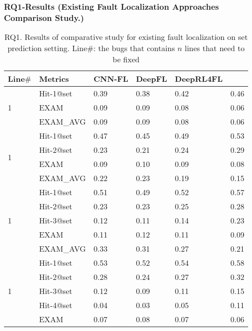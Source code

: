 \subsubsection{RQ1-Results ({\bf Existing Fault Localization Approaches Comparison Study.})}

\begin{table}[h]
	\caption{RQ1. Results of comparative study for existing fault localization on set prediction setting. Line$\#$: the bugs that contains $n$ lines that need to be fixed}
	{\small
		\begin{center}
			\renewcommand{\arraystretch}{1}
			\begin{tabular}{p{0.5cm}<{\centering}|p{1.5cm}<{\centering}|p{1cm}<{\centering}|p{0.8cm}<{\centering}|p{1.2cm}<{\centering}|p{1.2cm}<{\centering}}
				\hline
				Line$\#$ & Metrics & CNN-FL & DeepFL & DeepRL4FL & \tool \\
				\hline
				\multirow{3}{*}{1}   & Hit-1@set     & 0.39 & 0.38 & 0.42 & 0.46 \\
							    	 & EXAM          & 0.09 & 0.09 & 0.08 & 0.06 \\
									 & EXAM\_AVG     & 0.09 & 0.09 & 0.08 & 0.06 \\
				\hline
				\multirow{4}{*}{1}  & Hit-1@set     & 0.47 & 0.45 & 0.49 & 0.53 \\
									& Hit-2@set     & 0.23 & 0.21 & 0.24 & 0.29 \\
								   	& EXAM          & 0.09 & 0.10 & 0.09 & 0.08 \\
			                     	& EXAM\_AVG     & 0.22 & 0.23 & 0.19 & 0.15 \\
				\hline
				\multirow{5}{*}{1}  & Hit-1@set     & 0.51 & 0.49 & 0.52 & 0.57 \\
									& Hit-2@set     & 0.23 & 0.23 & 0.25 & 0.28 \\
									& Hit-3@set     & 0.12 & 0.11 & 0.14 & 0.23 \\
									& EXAM          & 0.11 & 0.12 & 0.11 & 0.09 \\
									& EXAM\_AVG     & 0.33 & 0.31 & 0.27 & 0.21 \\
				\hline
				\multirow{6}{*}{1}  & Hit-1@set     & 0.53 & 0.52 & 0.54 & 0.58 \\
									& Hit-2@set     & 0.28 & 0.24 & 0.27 & 0.32 \\
									& Hit-3@set     & 0.12 & 0.09 & 0.11 & 0.15 \\
									& Hit-4@set     & 0.04 & 0.03 & 0.05 & 0.11 \\
									& EXAM          & 0.07 & 0.08 & 0.07 & 0.06 \\

\end{tabular}
\end{center}}
\end{table}
